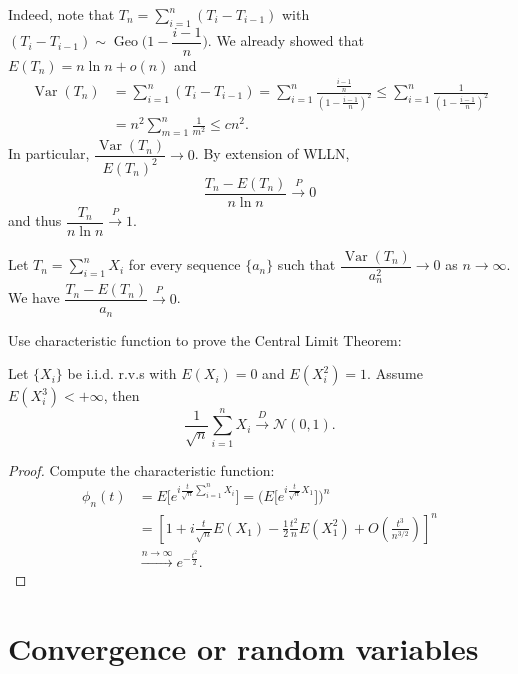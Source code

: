 \documentclass[11pt,singlecolumn, openany, citestyle=authoryear]{elegantbook}
\begin{document}
\begin{CJK}{UTF8}{gbsn}
\begin{example}
    Indeed, note that $T_n=\displaystyle \sum_{i=1}^n (T_i-T_{i-1})$ with 
    $(T_i-T_{i-1}) \sim \operatorname{Geo}\biggl(
        1-\dfrac{i-1}{n}
    \biggr)$.
    We already showed that $E(T_n)=n\ln n+o(n)$ and 
    \begin{align*}
    \operatorname{Var}(T_n)&=\sum_{i=1}^n (T_i-T_{i-1})=
    \sum_{i=1}^n\frac{\frac{i-1}{n}}{(1-\frac{i-1}{n})^2}
    \leqslant
    \sum_{i=1}^n\frac{1}{(1-\frac{i-1}{n})^2}\\
    &=n^2 \sum_{m=1}^n \frac{1}{m^2}\leqslant cn^2.
    \end{align*}
    In particular, $\dfrac{\operatorname{Var}(T_n)}{E(T_n)^2}\to 0$. By 
    extension of WLLN, 
    $$
    \frac{T_n-E(T_n)}{n\ln n}\overset{P}{\longrightarrow} 0
    $$
    and thus $\dfrac{T_n}{n\ln n}\overset{P}{\longrightarrow} 1$.
\end{example}
\begin{note}
    Let $T_n=\displaystyle \sum_{i=1}^n X_i$ for every sequence $\{a_n\}$ such that 
    $\dfrac{\operatorname{Var}(T_n)}{a_n^2}\to 0$ as $n\to\infty$. We have 
    $\dfrac{T_n-E(T_n)}{a_n}\overset{P}{\longrightarrow} 0$.
\end{note}

\begin{exercise}
    Use characteristic function to prove the Central Limit Theorem:
    \begin{theorem}
        Let $\{X_i\}$ be i.i.d. r.v.s with $E(X_i)=0$ and $E(X_i^2)=1$.
        Assume $E(X_i^3)<+\infty$, then 
        $$
        \frac{1}{\sqrt{n}}\sum_{i=1}^n X_i
        \overset{D}{\longrightarrow} \mathcal{N}(0,1).
        $$
    \end{theorem}
\end{exercise}
\begin{proof}
    Compute the characteristic function:
    \begin{align*}
        \phi_n(t) &= E\bigg[e^{i\frac{t}{\sqrt{n}}\sum_{i=1}^n X_i}\bigg] =
        \bigg(E\bigg[e^{i\frac{t}{\sqrt{n}}X_1}\bigg]\bigg)^n \\
        &=\left[
            1+i\frac{t}{\sqrt{n}}E(X_1)-\frac{1}{2}\frac{t^2}{n}E(X_1^2)+O\left(
                \frac{t^3}{n^{3/2}}
            \right)
        \right]^n\\
        &\overset{n\to\infty}{\longrightarrow} e^{-\frac{t^2}{2}}.
    \end{align*}
\end{proof}

\chapter{Convergence or random variables}

\end{CJK}
\end{document}

